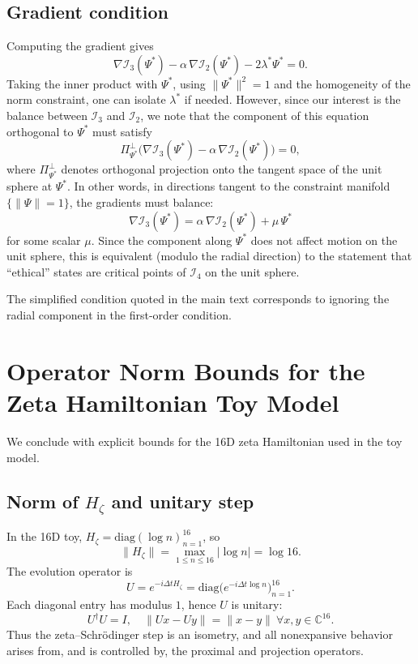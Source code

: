 \documentclass[11pt]{article}
\begin{document}
\subsection{Gradient condition}

Computing the gradient gives
\[
  \nabla\mathcal{I}_3(\Psi^*) - \alpha\,\nabla\mathcal{I}_2(\Psi^*) - 2\lambda^* \Psi^* = 0.
\]
Taking the inner product with $\Psi^*$, using $\|\Psi^*\|^2=1$ and the homogeneity of the norm constraint, one can isolate $\lambda^*$ if needed. However, since our interest is the balance between $\mathcal{I}_3$ and $\mathcal{I}_2$, we note that the component of this equation orthogonal to $\Psi^*$ must satisfy
\[
  \Pi_{\Psi^*}^\perp\bigl(\nabla\mathcal{I}_3(\Psi^*) - \alpha\,\nabla\mathcal{I}_2(\Psi^*)\bigr) = 0,
\]
where $\Pi_{\Psi^*}^\perp$ denotes orthogonal projection onto the tangent space of the unit sphere at $\Psi^*$. In other words, in directions tangent to the constraint manifold $\{\|\Psi\|=1\}$, the gradients must balance:
\[
  \nabla\mathcal{I}_3(\Psi^*) = \alpha\,\nabla\mathcal{I}_2(\Psi^*) + \mu\,\Psi^*
\]
for some scalar $\mu$. Since the component along $\Psi^*$ does not affect motion on the unit sphere, this is equivalent (modulo the radial direction) to the statement that ``ethical'' states are critical points of $\mathcal{I}_4$ on the unit sphere.

The simplified condition quoted in the main text corresponds to ignoring the radial component in the first-order condition.

\section{Operator Norm Bounds for the Zeta Hamiltonian Toy Model}

We conclude with explicit bounds for the 16D zeta Hamiltonian used in the toy model.

\subsection{Norm of $H_\zeta$ and unitary step}

In the 16D toy, $H_\zeta = \mathrm{diag}(\log n)_{n=1}^{16}$, so
\[
  \|H_\zeta\| = \max_{1\le n\le 16} |\log n| = \log 16.
\]
The evolution operator is
\[
  U = e^{-i\Delta t H_\zeta} = \mathrm{diag}\bigl(e^{-i\Delta t \log n}\bigr)_{n=1}^{16}.
\]
Each diagonal entry has modulus $1$, hence $U$ is unitary:
\[
  U^\dagger U = I,\quad \|Ux-Uy\| = \|x-y\|\ \forall x,y\in\mathbb{C}^{16}.
\]
Thus the zeta--Schr\"odinger step is an isometry, and all nonexpansive behavior arises from, and is controlled by, the proximal and projection operators.
\end{document}
